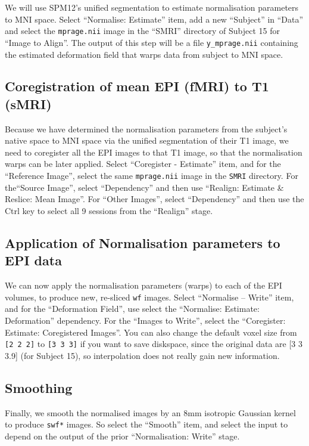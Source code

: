 We will use SPM12's unified segmentation to estimate normalisation parameters to MNI space. Select ``Normalise: Estimate'' item, add a new ``Subject'' in ``Data'' and select the \texttt{mprage.nii} image in the ``SMRI'' directory of Subject 15 for ``Image to Align''. The output of this step will be a file \texttt{y\_mprage.nii} containing the estimated deformation field that warps data from subject to MNI space.

\subsection{Coregistration of mean EPI (fMRI) to T1 (sMRI)}

Because we have determined the normalisation parameters from the subject's native space to MNI space via the unified segmentation of their T1 image, we need to coregister all the EPI images to that T1 image, so that the normalisation warps can be later applied. Select ``Coregister - Estimate'' item, and for the ``Reference Image'', select the same \texttt{mprage.nii} image in the \texttt{SMRI} directory. For the``Source Image'', select ``Dependency'' and then use ``Realign: Estimate \& Reslice: Mean Image''. For ``Other Images'', select ``Dependency'' and then use the Ctrl key to select all 9 sessions from the ``Realign'' stage.

\subsection{Application of Normalisation parameters to EPI data}

We can now apply the normalisation parameters (warps) to each of the EPI volumes, to produce new, re-sliced \texttt{wf} images. Select ``Normalise -- Write'' item, and for the ``Deformation Field'', use select the ``Normalise: Estimate: Deformation'' dependency. For the ``Images to Write'', select the ``Coregister: Estimate: Coregistered Images''. You can also change the default voxel size from \texttt{[2 2 2]} to \texttt{[3 3 3]} if you want to save diskspace, since the original data are [3 3 3.9] (for Subject 15), so interpolation does not really gain new information.

\subsection{Smoothing}

Finally, we smooth the normalised images by an 8mm isotropic Gaussian kernel to produce \texttt{swf*} images. So select the ``Smooth'' item, and select the input to depend on the output of the prior ``Normalisation: Write'' stage.

